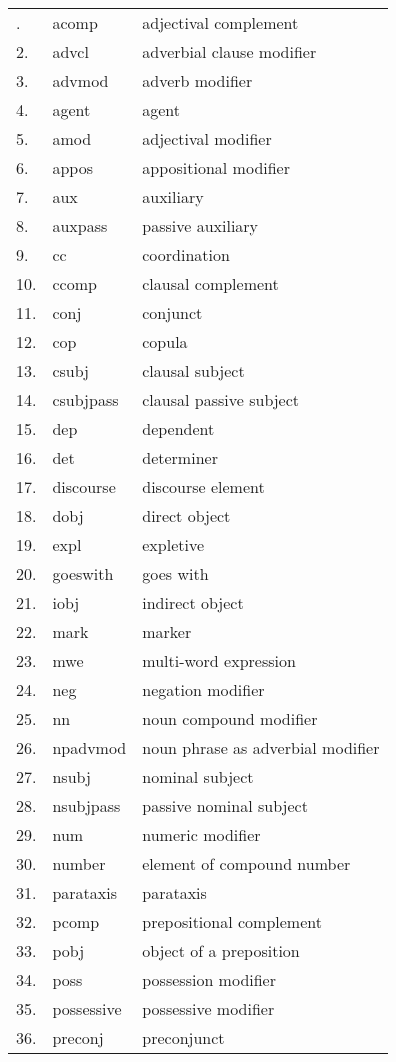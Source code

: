 \begin{longtable}{|l|l|l|}
\hline \hline
\endlastfoot
  1. & acomp & adjectival complement \\
2. & advcl & adverbial clause modifier\\
3. & advmod & adverb modifier\\
4. & agent & agent\\
5. & amod & adjectival modifier\\
6. & appos & appositional modifier\\
7. & aux & auxiliary\\
8. & auxpass & passive auxiliary\\
9. & cc & coordination\\
10. & ccomp & clausal complement\\
11. & conj & conjunct\\
12. & cop & copula\\
13. & csubj & clausal subject\\
14. & csubjpass & clausal passive subject\\
15. & dep & dependent\\
16. & det & determiner\\
17. & discourse & discourse element\\
18. & dobj & direct object\\
19. & expl & expletive\\
20. & goeswith & goes with\\
21. & iobj & indirect object\\
22. & mark & marker\\
23. & mwe & multi-word expression\\
24. & neg & negation modifier\\
25. & nn & noun compound modifier\\
26. & npadvmod & noun phrase as adverbial modifier\\
27. & nsubj & nominal subject\\
28. & nsubjpass & passive nominal subject\\
29. & num & numeric modifier\\
30. & number & element of compound number\\
31. & parataxis & parataxis\\
32. & pcomp & prepositional complement\\
33. & pobj & object of a preposition\\
34. & poss & possession modifier\\
35. & possessive & possessive modifier\\
36. & preconj & preconjunct\\

\end{longtable}

